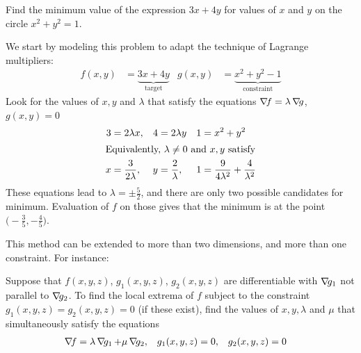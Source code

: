 \begin{example}
Find the minimum value of the expression $3x+4y$ for values of $x$ and $y$ on the circle $x^2+y^2=1$.

We start by modeling this problem to adapt the technique of Lagrange multipliers:
\begin{align*}
f(x,y) &= \underbrace{3x+4y}_{\text{target}} & g(x,y)&=\underbrace{x^2+y^2-1}_{\text{constraint}}
\end{align*}
Look for the values of $x,y$ and $\lambda$ that satisfy the equations $\mathop{\nabla\! {f}} = \lambda\mathop{\nabla\! {g}}$, $g(x,y)=0$
\begin{align*}
3 &= 2\lambda x, & 4 &= 2\lambda y & 1 &= x^2+y^2 \\
\intertext{Equivalently, $\lambda \neq 0$ and $x,y$ satisfy}
x &= \frac{3}{2\lambda}, & y &= \frac{2}{\lambda}, &1 &= \frac{9}{4\lambda^2}+\frac{4}{\lambda^2}
\end{align*}
These equations lead to $\lambda = \pm \frac{5}{2}$, and there are only two possible candidates for minimum. Evaluation of $f$ on those gives that the minimum is at the point $\big(-\frac{3}{5}, -\frac{4}{5} \big)$.
\end{example}

This method can be extended to more than two dimensions, and more than one constraint.  For instance:
\begin{theorem}\label{theorem:LM2C}
Suppose that $f(x,y,z)$, $g_1(x,y,z)$, $g_2(x,y,z)$ are differentiable with $\mathop{\nabla\! {g_1}}$ not parallel to $\mathop{\nabla\! {g_2}}$.  To find the local extrema of $f$ subject to the constraint $g_1(x,y,z)=g_2(x,y,z)=0$ (if these exist), find the values of $x,y, \lambda$ and $\mu$ that simultaneously satisfy the equations
\begin{align*}
\mathop{\nabla\! {f}} &= \lambda \mathop{\nabla\! {g_1}}+\mu\mathop{\nabla\! {g_2}}, &g_1(x,y,z)&=0, &g_2(x,y,z)&=0
\end{align*}
\end{theorem}

